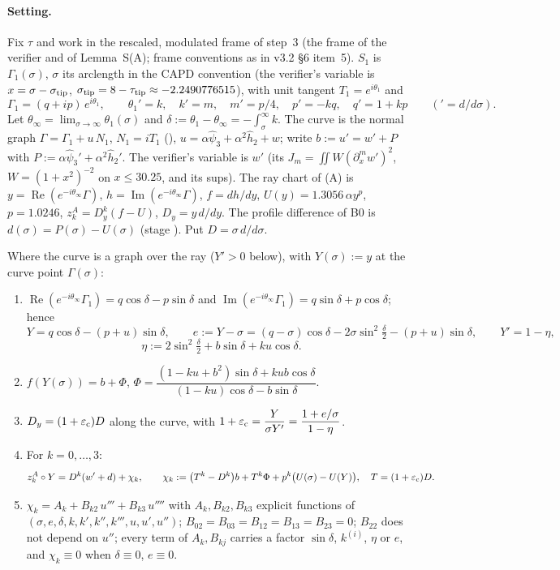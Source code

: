\paragraph{Setting.} Fix $\tau$ and work in the rescaled, modulated frame of step~3 (the frame of the verifier and of Lemma~S(A); frame conventions as in v3.2 \S6 item~5). $S_1$ is $\Gamma_1(\sigma)$, $\sigma$ its arclength in the CAPD convention (the verifier's variable is $x=\sigma-\sigma_{\rm tip}$, $\sigma_{\rm tip}=8-\tau_{\rm tip}\approx-2.2490776515$), with unit tangent $T_1=e^{i\theta_1}$ and
\[
\Gamma_1=(q+ip)\,e^{i\theta_1},\qquad \theta_1'=k,\quad k'=m,\quad m'=p/4,\quad p'=-kq,\quad q'=1+kp\qquad({}'=d/d\sigma).
\]
Let $\theta_\infty=\lim_{\sigma\to\infty}\theta_1(\sigma)$ and $\delta:=\theta_1-\theta_\infty=-\int_\sigma^\infty k$. The curve is the normal graph $\Gamma=\Gamma_1+u\,N_1$, $N_1=iT_1$ (), $u=\alpha\hat\psi_3+\alpha^2\hat h_2+w$; write $b:=u'=w'+P$ with $P:=\alpha\hat\psi_3'+\alpha^2\hat h_2'$. The verifier's variable is $w'$ (its $J_m=\iint W(\partial_x^mw')^2$, $W=(1+x^2)^{-2}$ on $x\le30.25$, and its sups). The ray chart of (A) is $y=\operatorname{Re}(e^{-i\theta_\infty}\Gamma)$, $h=\operatorname{Im}(e^{-i\theta_\infty}\Gamma)$, $f=dh/dy$, $U(y)=1.3056\,\alpha y^p$, $p=1.0246$, $z^A_k=D_y^k(f-U)$, $D_y=y\,d/dy$. The profile difference of B0 is $d(\sigma)=P(\sigma)-U(\sigma)$ (stage ). Put $D=\sigma\,d/d\sigma$.

\begin{lemma}\label{C:lem:id}
Where the curve is a graph over the ray ($Y'>0$ below), with $Y(\sigma):=y$ at the curve point $\Gamma(\sigma)$:
\begin{enumerate}
\item[(a)] $\operatorname{Re}(e^{-i\theta_\infty}\Gamma_1)=q\cos\delta-p\sin\delta$ and $\operatorname{Im}(e^{-i\theta_\infty}\Gamma_1)=q\sin\delta+p\cos\delta$; hence
\[Y=q\cos\delta-(p+u)\sin\delta,\qquad e:=Y-\sigma=(q-\sigma)\cos\delta-2\sigma\sin^2\tfrac\delta2-(p+u)\sin\delta,\qquad Y'=1-\eta,\]
\[\eta:=2\sin^2\tfrac\delta2+b\sin\delta+ku\cos\delta .\]
\item[(b)] $f(Y(\sigma))=b+\Phi$, \qquad $\Phi=\dfrac{(1-ku+b^2)\sin\delta+kub\cos\delta}{(1-ku)\cos\delta-b\sin\delta}$.
\item[(c)] $D_y=(1+\varepsilon_{\rm c})D$ along the curve, with $1+\varepsilon_{\rm c}=\dfrac{Y}{\sigma Y'}=\dfrac{1+e/\sigma}{1-\eta}$.
\item[(d)] For $k=0,\dots,3$:
\[
z^A_k\circ Y=D^k(w'+d)+\chi_k,\qquad \chi_k:=\bigl(T^k-D^k\bigr)b+T^k\Phi+p^k\bigl(U(\sigma)-U(Y)\bigr),\quad T=(1+\varepsilon_{\rm c})D .
\]
\item[(e)] $\chi_k=A_k+B_{k2}\,u'''+B_{k3}\,u''''$ with $A_k,B_{k2},B_{k3}$ explicit functions of $(\sigma,e,\delta,k,k',k'',k''',u,u',u'')$; $B_{02}=B_{03}=B_{12}=B_{13}=B_{23}=0$; $B_{22}$ does not depend on $u''$; every term of $A_k,B_{kj}$ carries a factor $\sin\delta$, $k^{(i)}$, $\eta$ or $e$, and $\chi_k\equiv0$ when $\delta\equiv0$, $e\equiv0$.
\end{enumerate}
\end{lemma}

